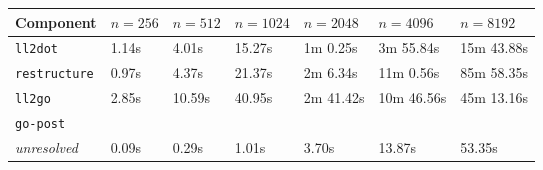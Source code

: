 \begin{table}[htbp]
	\begin{center}
		\begin{tabular}{|l|l|l|l|l|l|l|}
			\hline
			Component & $ n = 256 $ & $ n = 512 $ & $ n = 1024 $ & $ n = 2048 $ & $ n = 4096 $ & $ n = 8192 $ \\
			\hline
			\rowcolor{light_green_3}
			\texttt{ll2dot} & 1.14s & 4.01s & 15.27s & 1m 0.25s & 3m 55.84s & 15m 43.88s \\
			\rowcolor{light_green_3}
			\texttt{restructure} & 0.97s & 4.37s & 21.37s & 2m 6.34s & 11m 0.56s & 85m 58.35s \\
			\rowcolor{light_green_3}
			\texttt{ll2go} & 2.85s & 10.59s & 40.95s & 2m 41.42s & 10m 46.56s & 45m 13.16s \\
			\hline
			\multicolumn{7}{|l|}{\texttt{go-post}} \\
			\hline
			\rowcolor{light_green_3}
			\textit{unresolved} & 0.09s & 0.29s & 1.01s & 3.70s & 13.87s & 53.35s \\

\end{tabular}
\end{center}
\end{table}
